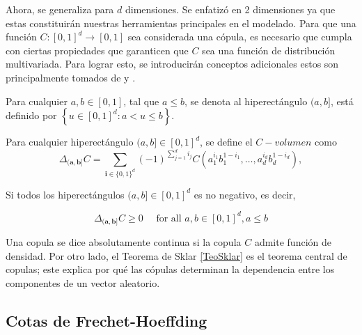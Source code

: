 
Ahora, se generaliza para $d$ dimensiones. Se enfatizó en 2 dimensiones ya que estas constituirán nuestras herramientas principales en el modelado. Para que una función $C: [0, 1]^d \to [0, 1]$ sea considerada una cópula, es necesario que cumpla con ciertas propiedades que garanticen que $C$ sea una función de distribución multivariada. Para lograr esto, se introducirán conceptos adicionales estos son principalmente tomados de \cite{nelsenintroduction} y \cite{TesisEmanuel}.

\begin{defn}
    Para cualquier $a, b \in [0, 1]$, tal que $a \leq b$, se denota al hiperectángulo $(a, b]$, está definido por $\left\{ u \in [0, 1]^{d}: a <u \leq b\right\}$.
\end{defn}

\begin{defn}
    Para cualquier hiperectángulo $(a, b] \in [0, 1]^d$, se define el $C-volumen$ como
    \begin{equation}
        \Delta_{(\boldsymbol{a}, \boldsymbol{b}]} C=\sum_{\boldsymbol{i} \in\{0,1\}^d}(-1)^{\sum_{j=1}^d i_j} C\left(a_1^{i_1} b_1^{1-i_1}, \ldots, a_d^{i_d} b_d^{1-i_d}\right),
    \end{equation}
\end{defn}

Si todos los hiperectángulos $(a, b] \in [0, 1]^d$ es no negativo, es decir, 

\begin{equation}
    \Delta_{(\boldsymbol{a}, \boldsymbol{b}]} C \geq 0 \quad \text { for all } a, b \in[0,1]^d, a \leq b
\end{equation}

Una copula se dice absolutamente continua si la copula $C$ admite función de densidad. Por otro lado, el Teorema de Sklar \ref{TeoSklar} es el teorema central de copulas; este explica por qué las cópulas determinan la dependencia entre los componentes de un vector aleatorio.



\subsection{Cotas de Frechet-Hoeffding}


